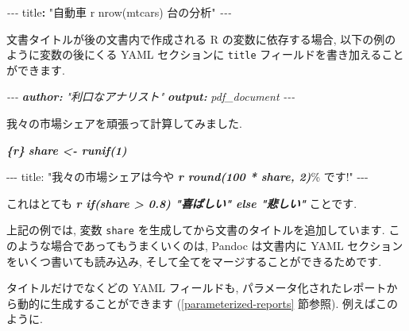 \documentclass[
  11pt,
  lualatex,ja=standard,jafont=noto]{bxjsreport}
\newenvironment{Shaded}{\begin{snugshade}}{\end{snugshade}}
\newcommand{\AnnotationTok}[1]{\textcolor[rgb]{0.56,0.35,0.01}{\textbf{\textit{#1}}}}
\newcommand{\AttributeTok}[1]{\textcolor[rgb]{0.77,0.63,0.00}{#1}}
\newcommand{\CommentTok}[1]{\textcolor[rgb]{0.56,0.35,0.01}{\textit{#1}}}
\newcommand{\FunctionTok}[1]{\textcolor[rgb]{0.00,0.00,0.00}{#1}}
\newcommand{\InformationTok}[1]{\textcolor[rgb]{0.56,0.35,0.01}{\textbf{\textit{#1}}}}
\newcommand{\KeywordTok}[1]{\textcolor[rgb]{0.13,0.29,0.53}{\textbf{#1}}}
\newcommand{\NormalTok}[1]{#1}
\newcommand{\PreprocessorTok}[1]{\textcolor[rgb]{0.56,0.35,0.01}{\textit{#1}}}
\newcommand{\StringTok}[1]{\textcolor[rgb]{0.31,0.60,0.02}{#1}}
\begin{document}
\begin{Shaded}
\begin{Highlighting}[]
\PreprocessorTok{{-}{-}{-}}
\FunctionTok{title}\KeywordTok{:}\AttributeTok{ }\StringTok{"自動車 \textasciigrave{}r nrow(mtcars)\textasciigrave{} 台の分析"}
\PreprocessorTok{{-}{-}{-}}
\end{Highlighting}
\end{Shaded}

文書タイトルが後の文書内で作成される R の変数に依存する場合, 以下の例のように変数の後にくる YAML セクションに \texttt{title} フィールドを書き加えることができます.

\begin{Shaded}
\begin{Highlighting}[]
\CommentTok{{-}{-}{-}}
\AnnotationTok{author:}\CommentTok{ "利口なアナリスト"}
\AnnotationTok{output:}\CommentTok{ pdf\_document}
\CommentTok{{-}{-}{-}}

\NormalTok{我々の市場シェアを頑張って計算してみました.}

\InformationTok{\textasciigrave{}\textasciigrave{}\textasciigrave{}\{r\}}
\InformationTok{share \textless{}{-} runif(1)}
\InformationTok{\textasciigrave{}\textasciigrave{}\textasciigrave{}}

\NormalTok{{-}{-}{-}}
\NormalTok{title: "我々の市場シェアは今や }\InformationTok{\textasciigrave{}r round(100 * share, 2)\textasciigrave{}}\NormalTok{\% です!"}
\NormalTok{{-}{-}{-}}

\NormalTok{これはとても }\InformationTok{\textasciigrave{}r if(share \textgreater{} 0.8) "喜ばしい" else "悲しい"\textasciigrave{}}\NormalTok{ ことです.}
\end{Highlighting}
\end{Shaded}

上記の例では, 変数 \texttt{share} を生成してから文書のタイトルを追加しています. このような場合であってもうまくいくのは, Pandoc は文書内に YAML セクションをいくつ書いても読み込み, そして全てをマージすることができるためです.

タイトルだけでなくどの YAML フィールドも, パラメータ化されたレポートから動的に生成することができます (\ref{parameterized-reports} 節参照). 例えばこのように.

\begin{Shaded}
\end{Shaded}
\end{document}
